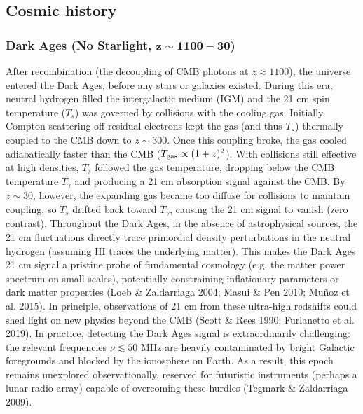 \documentclass[floats,floatfix,showpacs,amssymb,prd,superscriptaddress,nofootinbib]{revtex4-2} %
\begin{document}
\subsection{Cosmic history}
\subsubsection{Dark Ages (No Starlight, $\mathbf{z \sim 1100-30}$)}
After recombination (the decoupling of CMB photons at $z \approx 1100$), the universe entered the Dark Ages, before any stars or galaxies existed. During this era, neutral hydrogen filled the intergalactic medium (IGM) and the 21 cm spin temperature ($T_s$) was governed by collisions with the cooling gas. Initially, Compton scattering off residual electrons kept the gas (and thus $T_s$) thermally coupled to the CMB down to $z\sim300$. Once this coupling broke, the gas cooled adiabatically faster than the CMB (${T_{\rm gas}}\propto(1+z)^2$). With collisions still effective at high densities, $T_s$ followed the gas temperature, dropping below the CMB temperature $T_\gamma$ and producing a 21 cm absorption signal against the CMB. By $z\sim30$, however, the expanding gas became too diffuse for collisions to maintain coupling, so $T_s$ drifted back toward $T_\gamma$, causing the 21 cm signal to vanish (zero contrast). Throughout the Dark Ages, in the absence of astrophysical sources, the 21 cm fluctuations directly trace primordial density perturbations in the neutral hydrogen (assuming HI traces the underlying matter). This makes the Dark Ages 21 cm signal a pristine probe of fundamental cosmology (e.g. the matter power spectrum on small scales), potentially constraining inflationary parameters or dark matter properties (Loeb \& Zaldarriaga 2004; Masui \& Pen 2010; Muñoz et al. 2015). In principle, observations of 21 cm from these ultra-high redshifts could shed light on new physics beyond the CMB (Scott \& Rees 1990; Furlanetto et al. 2019). In practice, detecting the Dark Ages signal is extraordinarily challenging: the relevant frequencies $\nu \lesssim 50$ MHz are heavily contaminated by bright Galactic foregrounds and blocked by the ionosphere on Earth. As a result, this epoch remains unexplored observationally, reserved for futuristic instruments (perhaps a lunar radio array) capable of overcoming these hurdles (Tegmark \& Zaldarriaga 2009).
\end{document}
